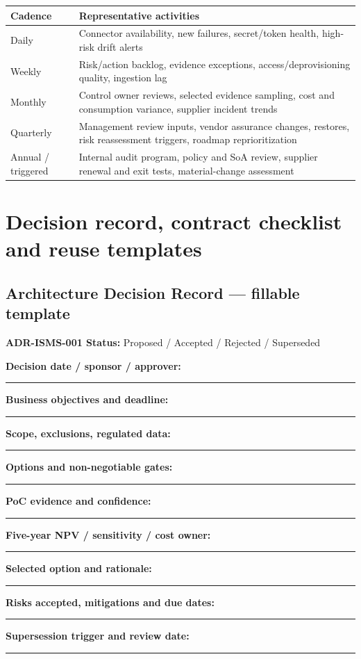 \documentclass[10pt,letterpaper]{article}
\begin{document}
\begin{tabularx}{\linewidth}{@{}L{0.95in}Y@{}}
\toprule
\textbf{Cadence} & \textbf{Representative activities}\\\midrule
Daily & Connector availability, new failures, secret/token health, high-risk drift alerts\\
Weekly & Risk/action backlog, evidence exceptions, access/deprovisioning quality, ingestion lag\\
Monthly & Control owner reviews, selected evidence sampling, cost and consumption variance, supplier incident trends\\
Quarterly & Management review inputs, vendor assurance changes, restores, risk reassessment triggers, roadmap reprioritization\\
Annual / triggered & Internal audit program, policy and SoA review, supplier renewal and exit tests, material-change assessment\\
\bottomrule
\end{tabularx}

\section{Decision record, contract checklist and reuse templates}
\subsection{Architecture Decision Record --- fillable template}
\begin{noteBox}
\textbf{ADR-ISMS-001 \quad Status:} Proposed / Accepted / Rejected / Superseded\par
\textbf{Decision date / sponsor / approver:} \rule{3.2in}{0.4pt}\par
\textbf{Business objectives and deadline:} \rule{3.2in}{0.4pt}\par
\textbf{Scope, exclusions, regulated data:} \rule{3.35in}{0.4pt}\par
\textbf{Options and non-negotiable gates:} \rule{3.05in}{0.4pt}\par
\textbf{PoC evidence and confidence:} \rule{3.3in}{0.4pt}\par
\textbf{Five-year NPV / sensitivity / cost owner:} \rule{2.5in}{0.4pt}\par
\textbf{Selected option and rationale:} \rule{3.38in}{0.4pt}\par
\textbf{Risks accepted, mitigations and due dates:} \rule{2.4in}{0.4pt}\par
\textbf{Supersession trigger and review date:} \rule{2.75in}{0.4pt}
\end{noteBox}
\end{document}
